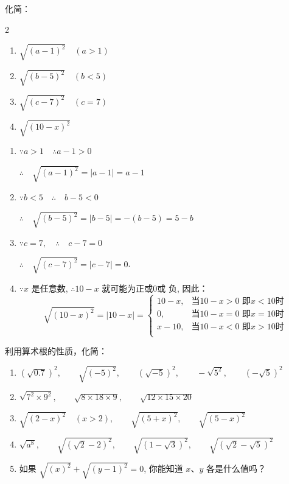 \begin{example}
    化简：
\begin{multicols}{2}
\begin{enumerate}
    \item $\sqrt{(a-1)^{2}}\quad (a>1)$
    \item $\sqrt{(b-5)^{2}}\quad (b<5)$
    \item $\sqrt{(c-7)^{2}}\quad (c=7)$
    \item $\sqrt{(10-x)^{2}}$
\end{enumerate}
\end{multicols}
\end{example}

\begin{solution}
\begin{enumerate}
    \item $\because a>1 \quad \therefore a-1>0$
    
    $\therefore \quad \sqrt{(a-1)^{2}}=|a-1|=a-1$
    \item   $\because b<5 \quad \therefore \quad b-5<0$
    
    $\therefore \quad \sqrt{(b-5)^{2}}=|b-5|=-(b-5)=5-b$

    \item  $\because c=7, \quad \therefore \quad c-7=0$
    
    $\therefore \quad \sqrt{(c-7)^{2}}=|c-7|=0$.

    \item  $\because x$ 是任意数, $\therefore 10-x$ 就可能为正或0或
    负, 因此：
\[\sqrt{(10-x)^2}=|10-x|=\begin{cases}
    10-x,& \text{当$10-x>0$ 即$x<10$时}\\
    0,&\text{当$10-x=0$ 即$x=10$时}\\
    x-10,&\text{当$10-x<0$ 即$x>10$时}\\
\end{cases} \]
\end{enumerate}
\end{solution}

\begin{ex}
    利用算术根的性质，化简：
\begin{enumerate}
    \item $(\sqrt{0.7})^{2},\qquad \sqrt{(-5)^{2}}, \qquad(\sqrt{-5})^{2},\qquad -\sqrt{5^{2}},\qquad (-\sqrt{5})^{2}$
    \item $\sqrt{7^{2} \times 9^{2}},\qquad \sqrt{8 \times 18 \times 9},\qquad \sqrt{12 \times 15 \times 20}$
    \item $\sqrt{(2-x)^{2}}\quad (x>2),\qquad \sqrt{(5+x)^{2}},\qquad \sqrt{(5-x)^{2}}$
    \item  $\sqrt{a^{8}},\qquad \sqrt{(\sqrt{2}-2)^{2}},\qquad \sqrt{(1-\sqrt{3})^{2}},\qquad \sqrt{(\sqrt{2}-\sqrt{5})^{2}}$
    \item 如果 $\sqrt{(x)^{2}}+\sqrt{(y-1)^{2}}=0$, 你能知道 $x$、$y$ 各是什么值吗？
\end{enumerate}
\end{ex}
    
